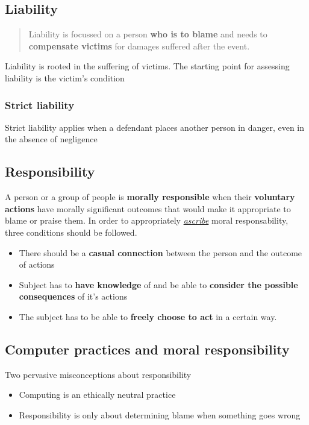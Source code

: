 \documentclass{article}
\newcommand{\worddef}[1]{\hyperref[sec:reference]{\textit{#1}}}
\begin{document}
\subsection{Liability}
\begin{quote}
Liability is focussed on a person \textbf{who is to blame} and needs to \textbf{compensate victims} for damages suffered after the event.
\end{quote}
\begin{flushleft}
Liability is rooted in the suffering of victims. The starting point for assessing liability is the victim's condition
\end{flushleft}

\subsubsection{Strict liability}
\begin{flushleft}
Strict liability applies when a defendant places another person in danger, even in the absence of negligence
\end{flushleft}

\subsection{Responsibility}

\begin{flushleft}
A person or a group of people is \textbf{morally responsible} when their \textbf{voluntary actions} have morally significant outcomes that would make it appropriate to blame or praise them. In order to appropriately \worddef{ascribe} moral responsability, three conditions should be followed.
\end{flushleft}
\begin{itemize}
  \item There should be a \textbf{casual connection} between the person and the outcome of actions
  \item Subject has to \textbf{have knowledge} of and be able to \textbf{consider the possible consequences} of it's actions
  \item The subject has to be able to \textbf{freely choose to act} in a certain way.
\end{itemize}

\subsection{Computer practices and moral responsibility}
Two pervasive misconceptions about responsibility
\begin{itemize}
  \item Computing is an ethically neutral practice
  \item Responsibility is only about determining blame when something goes wrong
\end{itemize}
\end{document}
